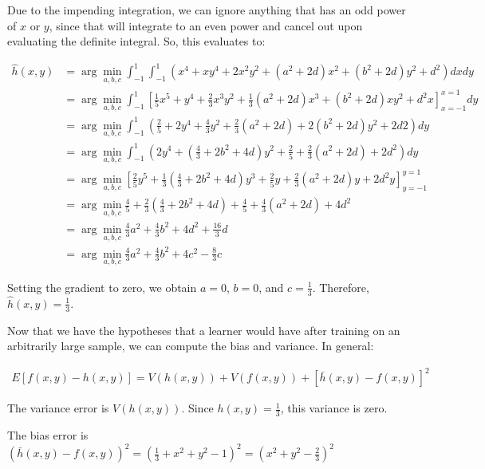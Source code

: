 \documentclass[fleqn]{homework}
\begin{document}
\begin{problem}{3}
\begin{enumerate}[(a)]
      Due to the impending integration, we can ignore anything that has an odd
      power of $x$ or $y$, since that will integrate to an even power and cancel
      out upon evaluating the definite integral.  So, this evaluates to:

      \begin{align*}
        \hat{h}(x,y) &= \arg \min_{a,b,c} \int_{-1}^1\int_{-1}^1 \left(x^4 + xy^4 + 2x^2y^2 + (a^2 + 2d)x^2 + (b^2 + 2d) y^2 + d^2 \right)dx dy \\
        &= \arg \min_{a,b,c} \int_{-1}^1 \left[\frac{1}{5}x^5 + y^4 + \frac{2}{3}x^3y^2 + \frac{1}{3}(a^2 + 2d)x^3 + (b^2 + 2d) xy^2 + d^2x \right]_{x=-1}^{x=1}dy \\
        &= \arg \min_{a,b,c} \int_{-1}^1 \left(\frac{2}{5} + 2y^4 + \frac{4}{3}y^2 + \frac{2}{3}(a^2+2d) + 2(b^2 + 2d)y^2 + 2d2\right)dy \\
        &= \arg \min_{a,b,c} \int_{-1}^1 \left( 2y^4 + \left(\frac{4}{3} + 2b^2 + 4d\right)y^2 + \frac{2}{5}+\frac{2}{3}(a^2+2d) + 2d^2\right)dy \\
        &= \arg \min_{a,b,c} \left[ \frac{2}{5}y^5 + \frac{1}{3}\left(\frac{4}{3} + 2b^2 + 4d\right)y^3 + \frac{2}{5}y+\frac{2}{3}(a^2+2d)y + 2d^2y\right]_{y=-1}^{y=1} \\
        &= \arg \min_{a,b,c} \frac{4}{5} + \frac{2}{3}\left(\frac{4}{3} + 2b^2 + 4d\right) + \frac{4}{5}+\frac{4}{3}(a^2+2d) + 4d^2 \\
        &= \arg \min_{a,b,c} \frac{4}{3}a^2 + \frac{4}{3}b^2 + 4d^2 + \frac{16}{3}d \\
        &= \arg \min_{a,b,c} \frac{4}{3}a^2 + \frac{4}{3}b^2 + 4c^2 - \frac{8}{3}c
      \end{align*}

      Setting the gradient to zero, we obtain $a=0$, $b=0$, and $c=\frac{1}{3}$.
      Therefore, $\hat{h}(x,y) = \frac{1}{3}$.

      Now that we have the hypotheses that a learner would have after training
      on an arbitrarily large sample, we can compute the bias and variance.  In
      general:

      \begin{align*}
        E[f(x,y) - h(x,y)] = V(h(x,y)) + V(f(x,y)) + [\bar{h}(x,y) - f(x,y)]^2
      \end{align*}

      The variance error is $V(h(x,y))$.  Since $h(x,y) = \frac{1}{3}$, this
      variance is zero.

      The bias error is
      $(\bar{h}(x,y) - f(x,y))^2 = (\frac{1}{3} + x^2 + y^2 - 1)^2 = (x^2 + y^2
      - \frac{2}{3})^2$


\end{enumerate}
\end{problem}
\end{document}
